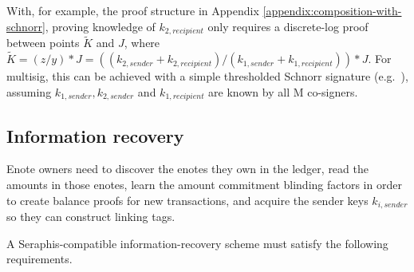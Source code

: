 \begin{itemize}
    With, for example, the proof structure in Appendix \ref{appendix:composition-with-schnorr}, proving knowledge of $k_{2, recipient}$ only requires a discrete-log proof between points $\tilde{K}$ and $J$, where $\tilde{K} = (z/y)*J = ((k_{2, sender} + k_{2, recipient})/(k_{1, sender} + k_{1, recipient}))*J$. For multisig, this can be achieved with a simple thresholded Schnorr signature (e.g.\ \cite{musig2-multisig, frost-multisig, multisig-security-simplemusig}), assuming $k_{1, sender}, k_{2, sender}$ and $k_{1, recipient}$ are known by all M co-signers.
\end{itemize}


\subsection{Information recovery}
\label{subsec:seraphis-information-recovery}

Enote owners need to discover the enotes they own in the ledger, read the amounts in those enotes, learn the amount commitment blinding factors in order to create balance proofs for new transactions, and acquire the sender keys $k_{i,sender}$ so they can construct linking tags.

A Seraphis-compatible information-recovery scheme must satisfy the following requirements.

